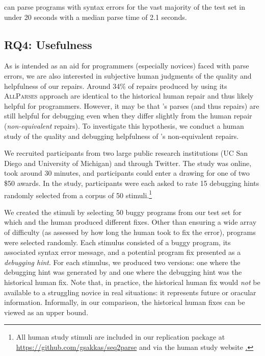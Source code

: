 \begin{framed}
  \noindent \toolname can parse programs with syntax errors for the vast
  majority of the test set in under 20 seconds with a median parse time of 2.1
  seconds.
\end{framed}

\subsection{RQ4: Usefulness}
\label{sec:eval:useful}


As \toolname is intended as an aid for programmers (especially novices) faced
with parse errors, we are also interested in subjective human judgments of the
quality and helpfulness of our repairs. Around 34\% of repairs produced by
\toolname using its \textsc{AllParses} approach are identical to the historical
human repair and thus likely helpful for programmers. However, it may be that
\toolname's parses (and thus repairs) are still helpful for debugging even when
they differ slightly from the human repair (\ie \textit{non-equivalent}
repairs). To investigate this hypothesis, we conduct a human study of the
quality and debugging helpfulness of \toolname's non-equivalent repairs.

 We recruited participants from two large public
research institutions (UC San Diego and University of Michigan) and through
Twitter. The study was online, took around 30 minutes, and participants could
enter a drawing for one of two \$50 awards. In the study, participants were each
asked to rate 15 debugging hints randomly selected from a corpus of 50
stimuli.\footnote{All human study stimuli are included in our replication
package at \url{https://github.com/gsakkas/seq2parse} and via the human study
website
\href{https://dijkstra.eecs.umich.edu/~endremad/APR_HumanEval/}.}

We created the stimuli by selecting 50 buggy programs from our test set for
which \toolname and the human produced different fixes. Other than ensuring a
wide array of difficulty (as assessed by how long the human took to fix the
error), programs were selected randomly. Each stimulus consisted of a buggy
program, its associated syntax error message, and a potential program fix
presented as a \emph{debugging hint}. For each stimulus, we produced two
versions: one where the debugging hint was generated by \toolname and one where
the debugging hint was the historical human fix. Note that, in practice, the
historical human fix would \emph{not} be available to a struggling novice
in real situations: it represents future or oracular information. Informally, in
our comparison, the historical human fixes can be viewed as an upper bound.

